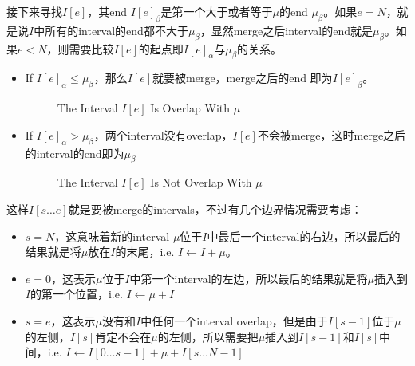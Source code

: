 接下来寻找$I[e]$，其end $I[e]_{\beta}$是第一个大于或者等于$\mu$的end $\mu_{\beta}$。如果$e = N$，就是说$I$中所有的interval的end都不大于$\mu_{\beta}$，显然merge之后interval的end就是$\mu_{\beta}$。如果$e < N$，则需要比较$I[e]$的起点即$I[e]_{\alpha}$与$\mu_{\beta}$的关系。
\begin{itemize}
    \item If $I[e]_{\alpha} \leq \mu_{\beta}$，那么$I[e]$就要被merge，merge之后的end 即为$I[e]_{\beta}$。
           \begin{figure}[H]
        \centering
        \caption{The Interval $I[e]$ Is Overlap With $\mu$}
    \end{figure}
    \item If $I[e]_{\alpha} > \mu_{\beta}$，两个interval没有overlap，$I[e]$不会被merge，这时merge之后的interval的end即为$\mu_{\beta}$
        \begin{figure}[H]
        \centering
        \caption{The Interval $I[e]$ Is Not Overlap With $\mu$}
    \end{figure}
\end{itemize}
这样$I[s\ldots e]$就是要被merge的intervals，不过有几个边界情况需要考虑：
\begin{itemize}
    \item $s = N$，这意味着新的interval $\mu$位于$I$中最后一个interval的右边，所以最后的结果就是将$\mu$放在$I$的末尾，i.e. $I \gets I + \mu$。
    \item $e = 0$，这表示$\mu$位于$I$中第一个interval的左边，所以最后的结果就是将$\mu$插入到$I$的第一个位置，i.e. $I \gets \mu + I$
    \item $s = e$，这表示$\mu$没有和$I$中任何一个interval overlap，但是由于$I[s-1]$位于$\mu$的左侧，$I[s]$肯定不会在$\mu$的左侧，所以需要把$\mu$插入到$I[s-1]$和$I[s]$中间，i.e. $I \gets I[0\ldots s-1] + \mu + I[s\ldots N-1]$
\end{itemize}

